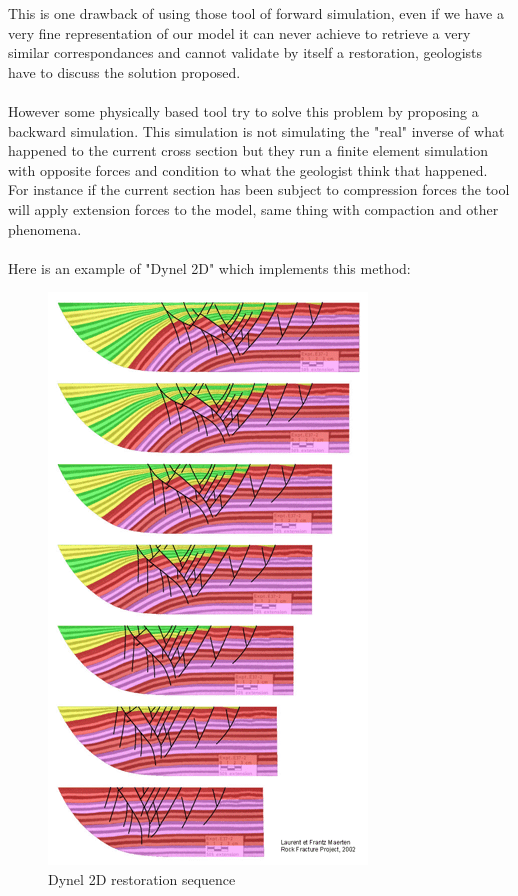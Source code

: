 \documentclass[12pt, a4paper]{report} %
\begin{document}
 This is one drawback of using those tool of forward simulation, even if we have a very fine representation of our model it can never achieve to retrieve a very similar correspondances and cannot validate by itself a restoration, geologists have to discuss the solution proposed.\\\\ 
 However some physically based tool try to  solve this problem by proposing a backward simulation. This simulation is not simulating the "real" inverse of what happened to the current cross section but they run a finite element simulation with opposite forces and condition to what the geologist think that happened. For instance if the current section has been subject to compression forces the tool will apply extension forces to the model, same thing with compaction and other phenomena.\\\\
 Here is an example of "Dynel 2D" \cite{Dynel} which implements this method:
 \begin{figure}[H]
	\centering
	\includegraphics[scale=0.5]{dynel2D.png}
	\caption{Dynel 2D restoration sequence}
\end{figure}
 
\end{document}
